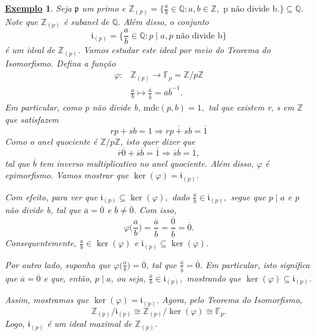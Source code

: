 \documentclass{article}
\newtheorem{example}{\underline{Exemplo}}
\begin{document}
    \begin{example}
      Seja \(\mathfrak{p}\) um primo e \(\mathbb{Z}_{(p)} = \biggl\{\frac{a}{b}\in \mathbb{Q}:a, b\in \mathbb{Z}, \text{ p não divide b.}\biggr\} \subseteq \mathbb{Q}\).
      Note que \(\mathbb{Z}_{(p)}\) é subanel de \(\mathbb{Q}.\) Além disso, o conjunto 
      \[
        \mathfrak{i}_{(p)}=\biggl\{\frac{a}{b}\in \mathbb{Q}: p\mid a, p \text{ não divide b}\biggr\}
      \]
      é um ideal de \(\mathbb{Z}_{(p)}\). Vamos estudar este ideal por meio do Teorema do Isomorfismo. Defina a função 
      \begin{align*}
        \varphi : &\mathbb{Z}_{(p)}\rightarrow \mathbb{F}_{p} = \mathbb{Z}/p \mathbb{Z}\\
                  &\frac{a}{b}\mapsto \frac{\overline{a}}{\overline{b}} = \overline{a}\overline{b}^{-1}.
      \end{align*}
      Em particular, como p não divide b, \(\mathrm{mdc}(p, b) = 1,\) tal que existem r, s em \(\mathbb{Z}\) que satisfazem 
      \[
        rp + sb = 1 \Rightarrow \overline{rp + sb} = \overline{1}
      \]
      Como o anel quociente é \(\mathbb{Z}/p \mathbb{Z}\), isto quer dizer que 
      \[
        \overline{r}\overline{0} + \overline{s}\overline{b} = \overline{1} \Rightarrow \overline{s}\overline{b} = \overline{1},
      \]
      tal que \(\overline{b}\) tem inverso multiplicativo no anel quociente. Além disso, \(\varphi \) é epimorfismo. Vamos mostrar que 
      \(\ker{(\varphi )} = \mathfrak{i}_{(p)}.\) 

      Com efeito, para ver que \(\mathfrak{i}_{(p)}\subseteq \ker{(\varphi )},\) dado \(\frac{a}{b}\in \mathfrak{i}_{(p)},\) segue que \(p\mid a\) e p não divide b, tal que 
      \(\overline{a} = \overline{0}\) e \(\overline{b}\neq \overline{0}.\) Com isso, 
      \[
        \varphi \biggl(\frac{a}{b}\biggr) = \frac{\overline{a}}{\overline{b}} = \frac{\overline{0}}{\overline{b}} = \overline{0}.
      \]
      Consequentemente, \(\frac{a}{b}\in \ker{(\varphi )}\) e \(\mathfrak{i}_{(p)}\subseteq \ker{(\varphi )}\).

      Por outro lado, suponha que \(\varphi \biggl(\frac{a}{b}\biggr)=\overline{0}\), tal que \(\frac{\overline{a}}{\overline{b}} = \overline{0}\). Em particular, isto significa que 
      \(\overline{a} = \overline{0}\) e que, então, \(p\mid a\), ou seja, \(\frac{a}{b}\in \mathfrak{i}_{(p)},\) mostrando que \(\ker{(\varphi )}\subseteq \mathfrak{i}_(p)\).

      Assim, mostramos que \(\ker{(\varphi )} = \mathfrak{i}_{(p)}.\) Agora, pelo Teorema do Isomorfismo,
      \[
        \mathbb{Z}_{(p)}/\mathfrak{i}_{(p)} \cong{\mathbb{Z}_{(p)}/\ker{(\varphi )}} \cong{\mathbb{F}_{p}}.
      \]
      Logo, \(\mathfrak{i}_{(p)}\) é um ideal maximal de \(\mathbb{Z}_{(p)}\).


\end{example}
\end{document}
